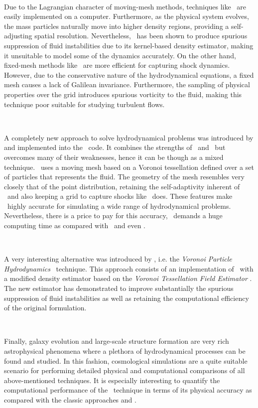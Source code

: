 \documentclass[a4,useAMS,usenatbib,usegraphicx,12pt]{article}
\begin{document}
\

Due to the Lagrangian character of moving-mesh methods, techniques like \SPH\ 
are easily implemented on a computer. Furthermore, as the physical system 
evolves, the mass particles naturally move into higher density regions, 
providing a self-adjusting spatial resolution. Nevertheless, \SPH\ has been 
shown to produce spurious suppression of fluid instabilities due to its 
kernel-based density estimator, making it unsuitable to model some of the 
dynamics accurately. On the other hand, fixed-mesh methods like \AMR\ are more 
efficient for capturing shock dynamics. However, due to the conservative nature 
of the hydrodynamical equations, a fixed mesh causes a lack of Galilean 
invariance. Furthermore, the sampling of physical properties over the grid 
introduces spurious vorticity to the fluid, making this technique poor suitable 
for studying turbulent flows.

\

A completely new approach to solve hydrodynamical problems was introduced by 
\citet{Springel10} and implemented into the \AREPO\ code. It combines the 
strengths of \AMR\ and \SPH\ but overcomes many of their weaknesses, hence it 
can be though as a mixed technique. \AREPO\ uses a moving mesh based on a 
Voronoi tessellation defined over a set of particles that represents the fluid. 
The geometry of the mesh resembles very closely that of the point distribution,
retaining the self-adaptivity inherent of \SPH\ and also keeping a grid to 
capture shocks like \AMR\ does. These features make \AREPO\ highly accurate for
simulating a wide range of hydrodynamical problems. Nevertheless, there is a 
price to pay for this accuracy, \AREPO\ demands a huge computing time as 
compared with \SPH\ and even \AMR.

\

A very interesting alternative was introduced by \citet{Hess10}, i.e. the 
\textit{Voronoi Particle Hydrodynamics} \VPH\ technique. This approach consists
of an implementation of \SPH\ with a modified density estimator based on the  
\textit{Voronoi Tessellation Field Estimator} \VTFE. The new estimator
has demonstrated to improve substantially the spurious suppression of fluid 
instabilities as well as retaining the computational efficiency of the original 
formulation.

\

Finally, galaxy evolution and large-scale structure formation are very rich 
astrophysical phenomena where a plethora of hydrodynamical processes can be 
found and studied. In this fashion, cosmological simulations are a quite 
suitable scenario for performing detailed physical and computational 
comparisons of all above-mentioned techniques. It is especially interesting to 
quantify the computational performance of the \VPH\ technique in terms of its 
physical accuracy as compared with the classic approaches and \AREPO.
\end{document}
